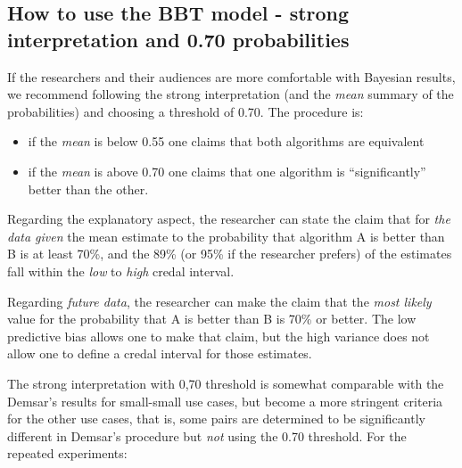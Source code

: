\documentclass[twoside,11pt,preprint]{article}
\begin{document}
\hypertarget{how-to-use-the-bbt-model---strong-interpretation-and-0.70-probabilities}{%
\subsection{How to use the BBT model - strong interpretation and 0.70 probabilities}\label{how-to-use-the-bbt-model---strong-interpretation-and-0.70-probabilities}}

If the researchers and their audiences are more comfortable with
Bayesian results, we recommend following the strong interpretation
(and the {\em mean} summary of the probabilities) and choosing a
threshold of 0.70. The procedure is:

\begin{itemize}
\item
  if the {\em mean} is below 0.55 one claims that both algorithms are equivalent
\item
  if the {\em mean} is above 0.70 one claims that one algorithm is ``significantly'' better than the other.
\end{itemize}

Regarding the explanatory aspect, the researcher can state the claim
that for \emph{the data given} the mean estimate to the probability that
algorithm A is better than B is at least 70\%, and the 89\% (or 95\% if
the researcher prefers) of the estimates fall within the {\em low} to
{\em high} credal interval.

Regarding \emph{future data}, the researcher can make the claim that the
\emph{most likely} value for the probability that A is better than B is 70\%
or better. The low predictive bias allows one to make that claim, but
the high variance does not allow one to define a credal interval for
those estimates.

The strong interpretation with 0,70 threshold is somewhat comparable
with the Demsar's results for small-small use cases, but become a more
stringent criteria for the other use cases, that is, some pairs are
determined to be significantly different in Demsar's procedure but
\emph{not} using the 0.70 threshold. For the repeated experiments:
\end{document}

